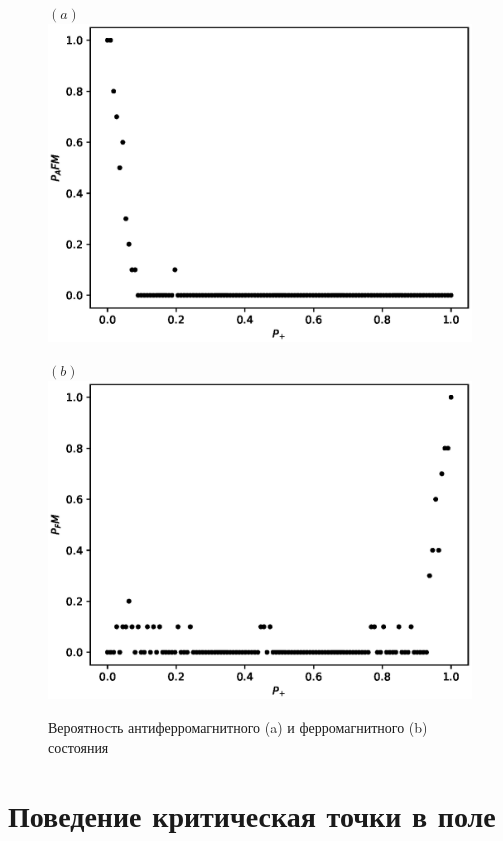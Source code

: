 \documentclass[utf8, babel, sor, jor, amsmath, amssymb, reprint]{elsarticle} %
\begin{document}
\begin{figure}[H]
	\begin{minipage}[h]{0.45\linewidth}
		\centering $(a)$
		\includegraphics[width=1\linewidth]{images/P_AFM_G(Mgs).eps}
	\end{minipage}
	\hfill
	\begin{minipage}[h]{0.45\linewidth}
		\centering $(b)$
		\includegraphics[width=1\linewidth]{images/P_FM_G(Mgs).eps}
	\end{minipage}
	\caption{Вероятность антиферромагнитного (a) и ферромагнитного (b) состояния}
	\label{fig:P_AFM_FM_G(Mgs)}
\end{figure}

\section{Поведение критическая точки в поле}
\end{document}

